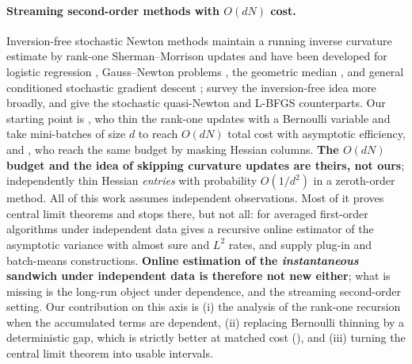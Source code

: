
\paragraph{Streaming second-order methods with $O(dN)$ cost.}
Inversion-free stochastic Newton methods maintain a running inverse curvature estimate by
rank-one Sherman--Morrison updates \citep{sherman1950adjustment} and have been developed
for logistic regression \citep{bercu2020efficient}, Gauss--Newton problems
\citep{cenac2025efficient}, the geometric median
\citep{godichonbaggioni2024online}, and general conditioned stochastic gradient descent
\citep{leluc2023asymptotic,boyer2023asymptotic}; \citet{chau2024inversion} survey the
inversion-free idea more broadly, and \citet{byrd2016stochastic,wang2017stochastic,moritz2016linearly}
give the stochastic quasi-Newton and L-BFGS counterparts. Our starting point is
\citet{godichonbaggioni2025adaptive}, who thin the rank-one updates with a Bernoulli
variable and take mini-batches of size $d$ to reach $O(dN)$ total cost with asymptotic
efficiency, and \citet{godichonbaggioni2026complexity}, who reach the same budget by
masking Hessian columns. \textbf{The $O(dN)$ budget and the idea of skipping curvature
updates are theirs, not ours}; \citet{chen2024online} independently thin Hessian
\emph{entries} with probability $O(1/d^2)$ in a zeroth-order method. All of this work assumes independent
observations. Most of it proves central limit theorems and stops there, but not all: for
averaged first-order algorithms under independent data \citet{godichonbaggioni2019online}
gives a recursive online estimator of the asymptotic variance with almost sure and $L^2$
rates, and \citet{chen2020statistical,zhu2023online,godichonbaggioni2024online} supply
plug-in and batch-means constructions. \textbf{Online estimation of the
\emph{instantaneous} sandwich under independent data is therefore not new either}; what is
missing is the long-run object under dependence, and the streaming second-order setting. Our contribution on this axis is
(i) the analysis of the rank-one recursion when the accumulated terms are dependent,
(ii) replacing Bernoulli thinning by a deterministic gap, which is strictly better at
matched cost (), and (iii) turning the central limit theorem into usable
intervals.

